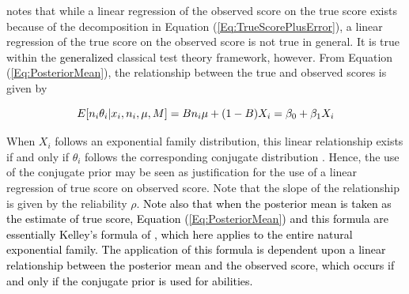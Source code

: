 \documentclass[12pt,epsfig]{article}
\newcommand{\change}[1]{\textcolor{black}{#1}}
\begin{document}






\cite{Novick1966} notes that while a linear regression of the observed score on the true score exists because of the decomposition in Equation (\ref{Eq:TrueScorePlusError}), a linear regression of the true score on the observed score is not true in general. It is true within the \change{generalized} classical test theory framework, however. From Equation (\ref{Eq:PosteriorMean}), the relationship between the true and observed scores is given by

\begin{equation*}
    E[n_i \theta_i | x_i, n_i, \mu, M] = B \change{n_i} \mu + (1-B) X_i = \beta_0 + \beta_1 X_i
\end{equation*}

\noindent When $X_i$ follows an exponential family distribution, this linear relationship exists if and only if $\theta_i$ follows the corresponding conjugate distribution \citep{Diaconis1979}. Hence, the use of the conjugate prior may be seen as justification for the use of a linear regression of true score on observed score. Note that the slope of the relationship is given by the reliability $\rho$. \change{Note also that when the posterior mean is taken as the estimate of true score, Equation (\ref{Eq:PosteriorMean}) and this formula are essentially Kelley's formula of \cite{Kelley1923}, which here applies to the entire natural exponential family. The application of this formula is dependent upon a linear relationship between the posterior mean and the observed score, which occurs if and only if the conjugate prior is used for abilities.}
\end{document}
